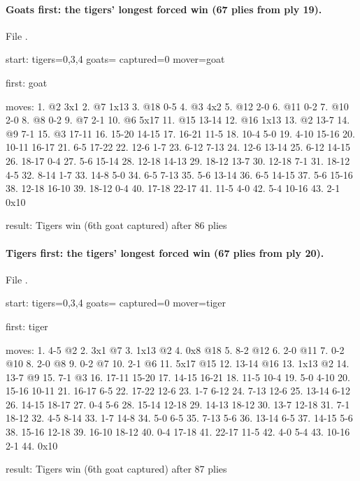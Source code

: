 \paragraph{Goats first: the tigers' longest forced win (67 plies from ply 19).} File .
\begin{gamelisting}
start: tigers=0,3,4 goats= captured=0 mover=goat\par
first: goat\par
moves: 1. @2 3x1 2. @7 1x13 3. @18 0-5 4. @3 4x2 5. @12 2-0 6. @11 0-2 7. @10 2-0 8. @8 0-2 9. @7 2-1 10. @6 5x17 11. @15 13-14 12. @16 1x13 13. @2 13-7 14. @9 7-1 15. @3 17-11 16. 15-20 14-15 17. 16-21 11-5 18. 10-4 5-0 19. 4-10 15-16 20. 10-11 16-17 21. 6-5 17-22 22. 12-6 1-7 23. 6-12 7-13 24. 12-6 13-14 25. 6-12 14-15 26. 18-17 0-4 27. 5-6 15-14 28. 12-18 14-13 29. 18-12 13-7 30. 12-18 7-1 31. 18-12 4-5 32. 8-14 1-7 33. 14-8 5-0 34. 6-5 7-13 35. 5-6 13-14 36. 6-5 14-15 37. 5-6 15-16 38. 12-18 16-10 39. 18-12 0-4 40. 17-18 22-17 41. 11-5 4-0 42. 5-4 10-16 43. 2-1 0x10\par
result: Tigers win (6th goat captured) after 86 plies\par
\end{gamelisting}

\paragraph{Tigers first: the tigers' longest forced win (67 plies from ply 20).} File .
\begin{gamelisting}
start: tigers=0,3,4 goats= captured=0 mover=tiger\par
first: tiger\par
moves: 1. 4-5 @2 2. 3x1 @7 3. 1x13 @2 4. 0x8 @18 5. 8-2 @12 6. 2-0 @11 7. 0-2 @10 8. 2-0 @8 9. 0-2 @7 10. 2-1 @6 11. 5x17 @15 12. 13-14 @16 13. 1x13 @2 14. 13-7 @9 15. 7-1 @3 16. 17-11 15-20 17. 14-15 16-21 18. 11-5 10-4 19. 5-0 4-10 20. 15-16 10-11 21. 16-17 6-5 22. 17-22 12-6 23. 1-7 6-12 24. 7-13 12-6 25. 13-14 6-12 26. 14-15 18-17 27. 0-4 5-6 28. 15-14 12-18 29. 14-13 18-12 30. 13-7 12-18 31. 7-1 18-12 32. 4-5 8-14 33. 1-7 14-8 34. 5-0 6-5 35. 7-13 5-6 36. 13-14 6-5 37. 14-15 5-6 38. 15-16 12-18 39. 16-10 18-12 40. 0-4 17-18 41. 22-17 11-5 42. 4-0 5-4 43. 10-16 2-1 44. 0x10\par
result: Tigers win (6th goat captured) after 87 plies\par
\end{gamelisting}

